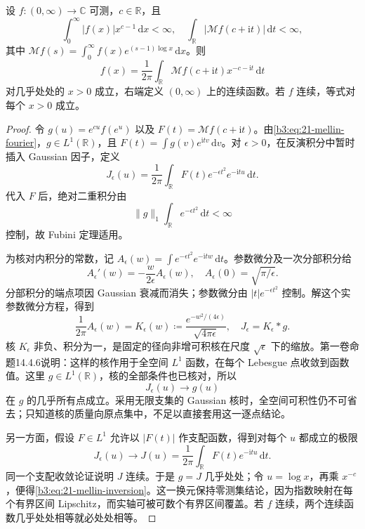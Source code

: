 \begin{theorem}[Mellin 反演]\label{b3:thm:21-mellin-inversion}
设 \(f:(0,\infty)\to\mathbb C\) 可测，\(c\in\mathbb R\)，且
\[
 \int_0^\infty|f(x)|x^{c-1}\,\mathrm dx<\infty,
 \quad \int_{\mathbb R}|\mathcal Mf(c+\mathrm it)|\,\mathrm dt<\infty,
\]
其中 \(\mathcal Mf(s)=\int_0^\infty f(x)e^{(s-1)\log x}\,\mathrm dx\)。则
\begin{equation}\label{b3:eq:21-mellin-inversion}
 f(x)=\frac1{2\pi}\int_{\mathbb R}
               \mathcal Mf(c+\mathrm it)x^{-c-\mathrm it}\,\mathrm dt
\end{equation}
对几乎处处的 \(x>0\) 成立，右端定义 \((0,\infty)\) 上的连续函数。若 \(f\) 连续，等式对每个 \(x>0\) 成立。
\end{theorem}
\begin{proof}
令 \(g(u)=e^{cu}f(e^u)\) 以及 \(F(t)=\mathcal Mf(c+\mathrm it)\)。由\eqref{b3:eq:21-mellin-fourier}，\(g\in L^1(\mathbb R)\)，且 \(F(t)=\int g(v)e^{\mathrm itv}\,\mathrm dv\)。对 \(\epsilon>0\)，在反演积分中暂时插入 Gaussian 因子，定义
\[
 J_\epsilon(u)=\frac1{2\pi}\int_{\mathbb R}
                   F(t)e^{-\epsilon t^2}e^{-\mathrm itu}\,\mathrm dt.
\]
代入 \(F\) 后，绝对二重积分由
\[
 \|g\|_1\int_{\mathbb R}e^{-\epsilon t^2}\,\mathrm dt<\infty
\]
控制，故 Fubini 定理适用。

为核对内积分的常数，记 \(A_\epsilon(w)=\int e^{-\epsilon t^2}e^{-\mathrm itw}\,\mathrm dt\)。参数微分及一次分部积分给
\[
 A_\epsilon'(w)=-\frac{w}{2\epsilon}A_\epsilon(w),
 \quad A_\epsilon(0)=\sqrt{\pi/\epsilon}.
\]
分部积分的端点项因 Gaussian 衰减而消失；参数微分由 \(|t|e^{-\epsilon t^2}\) 控制。解这个实参数微分方程，得到
\[
 \frac1{2\pi}A_\epsilon(w)
 =K_\epsilon(w)\coloneqq\frac{e^{-w^2/(4\epsilon)}}{\sqrt{4\pi\epsilon}},
 \quad J_\epsilon=K_\epsilon*g.
\]
核 \(K_\epsilon\) 非负、积分为一，是固定的径向非增可积核在尺度 \(\sqrt\epsilon\) 下的缩放。第一卷命题14.4.6说明：这样的核作用于全空间 \(L^1\) 函数，在每个 Lebesgue 点收敛到函数值。这里 \(g\in L^1(\mathbb R)\)，核的全部条件也已核对，所以
\[
 J_\epsilon(u)\longrightarrow g(u)
\]
在 \(g\) 的几乎所有点成立。采用无限支集的 Gaussian 核时，全空间可积性仍不可省去；只知道核的质量向原点集中，不足以直接套用这一逐点结论。

另一方面，假设 \(F\in L^1\) 允许以 \(|F(t)|\) 作支配函数，得到对每个 \(u\) 都成立的极限
\[
 J_\epsilon(u)\longrightarrow
 J(u)=\frac1{2\pi}\int_{\mathbb R}F(t)e^{-\mathrm itu}\,\mathrm dt.
\]
同一个支配收敛论证说明 \(J\) 连续。于是 \(g=J\) 几乎处处；令 \(u=\log x\)，再乘 \(x^{-c}\)，便得\eqref{b3:eq:21-mellin-inversion}。这一换元保持零测集结论，因为指数映射在每个有界区间 Lipschitz，而实轴可被可数个有界区间覆盖。若 \(f\) 连续，两个连续函数几乎处处相等就必处处相等。
\end{proof}

